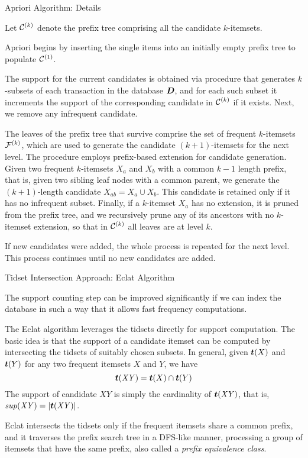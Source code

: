 \begin{frame}{Apriori Algorithm: Details}
  \small 
  
  Let ${\mathcal C}^{(k)}$ denote the pref\/{i}x tree comprising all the
  candidate $k$-itemsets.  

\medskip
Apriori begins by inserting the single items into an initially
empty pref\/{i}x tree to populate ${\mathcal C}^{(1)}$.

\medskip   The
support for the current candidates is obtained via
\algcomputesupport procedure that generates $k$-subsets of each
transaction in the database ${\boldsymbol D}$, and for each such subset it
increments the support of the corresponding candidate in ${\mathcal C}^{(k)}$ if it
exists. Next, we remove any infrequent candidate.

\medskip
The leaves of the pref\/{i}x tree that survive comprise the set of
frequent $k$-itemsets ${\mathcal F}^{(k)}$, which are used to generate the candidate
$(k+1)$-itemsets for the next level. The \algextprefix procedure employs
pref\/{i}x-based extension for candidate generation. Given two frequent
$k$-itemsets $X_a$ and $X_b$ with a common $k-1$ length pref\/{i}x, that
is, given two sibling leaf nodes with a common parent, we generate the
$(k+1)$-length candidate $X_{ab} = X_a \cup X_b$.  This candidate is
retained only if it has no infrequent subset. F{i}nally, if a
$k$-itemset $X_a$ has no extension, it is pruned from the pref\/{i}x
tree, and we recursively prune any of its ancestors with no $k$-itemset
extension, so that in ${\mathcal C}^{(k)}$ all leaves are at level $k$.  

\medskip If new
candidates were added, the whole process is repeated for the next level.
This process continues until no new candidates are added.
\end{frame}


\ifdefined\wox \begin{frame} \titlepage \end{frame} \fi


\begin{frame}{Tidset Intersection Approach: Eclat Algorithm}

  The support counting step can be improved signif\/{i}cantly if we can
  index the database in such a way that it allows fast frequency
  computations.

\medskip
The Eclat algorithm leverages the tidsets directly for support
computation. The basic idea is that the support of a candidate itemset
can be computed by intersecting the tidsets of suitably chosen subsets.
In general, given ${{\boldsymbol t}}(X)$ and ${{\boldsymbol t}}(Y)$ for any two frequent itemsets
$X$ and $Y$, we have $${{\boldsymbol t}}(\mathit{XY}) = {{\boldsymbol t}}(X) \cap {{\boldsymbol t}}(Y)$$ The
support of candidate $\mathit{XY}$ is simply the cardinality of
${{\boldsymbol t}}(\mathit{XY})$, that is, $\mathit{sup}(\mathit{XY}) =
|{{\boldsymbol t}}(\mathit{XY})|$.  


\medskip
Eclat intersects the tidsets only if the
frequent itemsets share a common pref\/{i}x, and it traverses the
pref\/{i}x search tree in a DFS-like manner, processing a group of
itemsets that have the same pref\/{i}x, also called a {\em pref\/{i}x
equivalence class}.

\end{frame}


